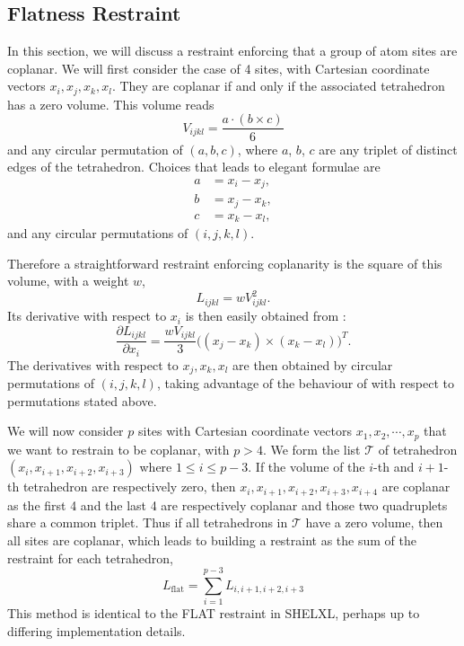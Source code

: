 \documentclass[pdf]{iucr}
\DeclareMathOperator{\dotprod}{\cdot}
\DeclareMathOperator{\crossprod}{\times}
\newcommand{\partialder}[2]{\frac{\partial #1}{\partial #2}}
\begin{document}
\subsection{Flatness Restraint}

In this section, we will discuss a restraint enforcing that a group of atom sites are coplanar. We will first consider the case of 4 sites, with Cartesian coordinate vectors $x_i, x_j, x_k, x_l$. They are coplanar if and only if the associated tetrahedron has a zero volume. This volume reads
\begin{equation}
V_{ijkl} = \frac{a \dotprod (b \crossprod c)}{6}
\label{eqn:tetrahedron:volume}
\end{equation}
and any circular permutation of $(a, b, c)$, where $a$, $b$, $c$ are any triplet of distinct edges of the tetrahedron. Choices that leads to elegant formulae are
\begin{align}
a &= x_i - x_j,\nonumber\\ 
b &= x_j - x_k,\label{eqn:tetrahedron:edges:choice1}\\ 
c &= x_k - x_l,\nonumber
\end{align}
and any circular permutations of $(i,j,k,l)$. 

Therefore a straightforward restraint enforcing coplanarity is the square of this volume, with a weight $w$,
\begin{equation}
L_{ijkl} = w V_{ijkl}^2.
\end{equation}
Its derivative with respect to $x_i$ is then easily obtained from :
\begin{equation}
\partialder{L_{ijkl}}{x_i} = \frac{wV_{ijkl}}{3}\big((x_j - x_k) \crossprod (x_k - x_l)\big)^T.
\end{equation}
The derivatives with respect to $x_j, x_k, x_l$ are then obtained by circular permutations of $(i,j,k,l)$, taking advantage of the behaviour of  with respect to permutations stated above.

We will now consider $p$ sites with Cartesian coordinate vectors $x_1, x_2, \cdots, x_p$ that we want to restrain to be coplanar, with $p>4$. We form the list $\mathcal{T}$ of tetrahedron $(x_i, x_{i+1}, x_{i+2}, x_{i+3})$ where $1 \le i \le p-3$. If the volume of the $i$-th and $i+1$-th tetrahedron are respectively zero, then $x_i, x_{i+1}, x_{i+2}, x_{i+3}, x_{i+4}$ are coplanar as the first 4 and the last 4 are respectively coplanar and those two quadruplets share a common triplet. Thus if all tetrahedrons in $\mathcal{T}$ have a zero volume, then all sites are coplanar, which leads to building a restraint as the sum of the restraint for each tetrahedron,
\begin{equation}
L_\text{flat} = \sum_{i=1}^{p-3} L_{i,i+1,i+2,i+3}
\label{eqn:restraint:flatness:many}
\end{equation}
This method is identical to the FLAT restraint in SHELXL, perhaps up to differing implementation details. 
\end{document}
